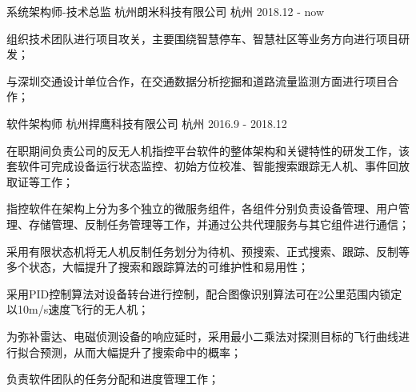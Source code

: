 

\begin{cventries}

  \cventry
    {系统架构师-技术总监} %
    {杭州朗米科技有限公司} %
    {杭州} %
    {2018.12 - now} %
    {
      \begin{cvitems} %
        \item {组织技术团队进行项目攻关，主要围绕智慧停车、智慧社区等业务方向进行项目研发；}
        \item {与深圳交通设计单位合作，在交通数据分析挖掘和道路流量监测方面进行项目合作；}
      \end{cvitems}
    }

  \cventry
    {软件架构师} %
    {杭州捍鹰科技有限公司} %
    {杭州} %
    {2016.9 - 2018.12} %
    {
      \begin{cvitems} %
        \item {在职期间负责公司的反无人机指控平台软件的整体架构和关键特性的研发工作，该套软件可完成设备运行状态监控、初始方位校准、智能搜索跟踪无人机、事件回放取证等工作；}
        \item {指控软件在架构上分为多个独立的微服务组件，各组件分别负责设备管理、用户管理、存储管理、反制任务管理等工作，并通过公共代理服务与其它组件进行通信；}
        \item {采用有限状态机将无人机反制任务划分为待机、预搜索、正式搜索、跟踪、反制等多个状态，大幅提升了搜索和跟踪算法的可维护性和易用性；}
        \item {采用PID控制算法对设备转台进行控制，配合图像识别算法可在2公里范围内锁定以10m/s速度飞行的无人机；}
        \item {为弥补雷达、电磁侦测设备的响应延时，采用最小二乘法对探测目标的飞行曲线进行拟合预测，从而大幅提升了搜索命中的概率；}
        \item {负责软件团队的任务分配和进度管理工作；}
      \end{cvitems}
    }


\end{cventries}
